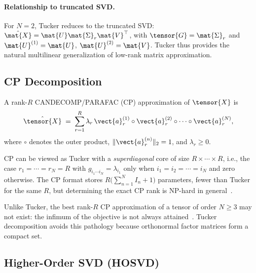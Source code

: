 \paragraph{Relationship to truncated SVD.}
For $N=2$, Tucker reduces to the truncated SVD:
$\hat{\mat{X}} = \mat{U} \mat{\Sigma}_r \mat{V}^\top$,
with $\tensor{G} = \mat{\Sigma}_r$ and
$\mat{U}^{(1)} = \mat{U}$, $\mat{U}^{(2)} = \mat{V}$.
Tucker thus provides the natural multilinear generalization of low-rank
matrix approximation.

\subsection{CP Decomposition}
\label{subsec:cp}

\begin{definition}[CP decomposition]
  A rank-$R$ CANDECOMP/PARAFAC (CP) approximation of $\tensor{X}$ is
  \begin{equation}
    \hat{\tensor{X}}
    \;=\; \sum_{r=1}^{R} \lambda_r\,
          \vect{a}_r^{(1)} \circ \vect{a}_r^{(2)} \circ \cdots \circ
          \vect{a}_r^{(N)},
    \label{eq:cp}
  \end{equation}
  where $\circ$ denotes the outer product,
  $\|\vect{a}_r^{(n)}\|_2 = 1$, and $\lambda_r \geq 0$.
\end{definition}

CP can be viewed as Tucker with a \emph{superdiagonal} core of size
$R \times \cdots \times R$, i.e., the case $r_1 = \cdots = r_N = R$
with $g_{i_1 \cdots i_N} = \lambda_{i_1}$ only when
$i_1 = i_2 = \cdots = i_N$ and zero otherwise.
The CP format stores
$R \bigl(\sum_{n=1}^{N} I_n + 1\bigr)$
parameters, fewer than Tucker for the same $R$, but determining the exact
CP rank is NP-hard in general~\cite{kolda2009tensor}.

\begin{remark}[CP degeneracy]
  Unlike Tucker, the best rank-$R$ CP approximation of a tensor of order
  $N \geq 3$ may not exist: the infimum of the objective is not always
  attained~\cite{kolda2009tensor}.
  Tucker decomposition avoids this pathology because orthonormal factor
  matrices form a compact set.
\end{remark}

\subsection{Higher-Order SVD (HOSVD)}
\label{subsec:hosvd}

